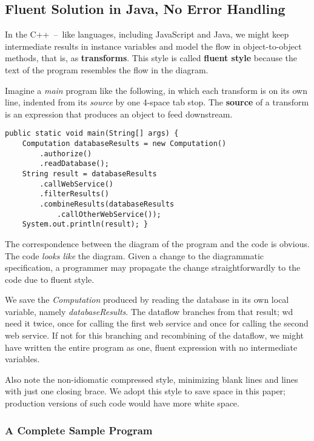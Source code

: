 \documentclass[11pt]{article}
\begin{document}
\subsection{Fluent Solution in Java, No Error Handling}
\label{sec-2-1}

In the \mbox{C++ -- like} languages, including JavaScript and Java,
we might keep intermediate results in instance variables and model
the flow in object-to-object methods, that is, as
\textbf{transforms}. This style is called \textbf{fluent style}
because the text of the program resembles the flow in the diagram.

Imagine a \emph{main} program like the following, in which each transform
is on its own line, indented from its \emph{source} by one
\mbox{4-space} tab stop. The \textbf{source} of a transform is an
expression that produces an object to feed downstream.
\begin{verbatim}
public static void main(String[] args) {
    Computation databaseResults = new Computation()
        .authorize()
        .readDatabase();
    String result = databaseResults
        .callWebService()
        .filterResults()
        .combineResults(databaseResults
            .callOtherWebService());
    System.out.println(result); }
\end{verbatim}

The correspondence between the diagram of the program and the code
is obvious. The code \emph{looks like} the diagram. Given a change to the
diagrammatic specification, a programmer may propagate the change
straightforwardly to the code due to fluent style.

We save the \emph{Computation} produced by reading the database in its
own local variable, namely \emph{databaseResults}. The dataflow branches
from that result; wd need it twice, once for calling the first web
service and once for calling the second web service. If not for this
branching and recombining of the dataflow, we might have written the
entire program as one, fluent expression with no intermediate
variables.

Also note the non-idiomatic compressed style, minimizing blank lines
and lines with just one closing brace. We adopt this style to save
space in this paper; production versions of such code would have
more white space.

\subsubsection{A Complete Sample Program}
\label{sec-2-1-1}
\end{document}
